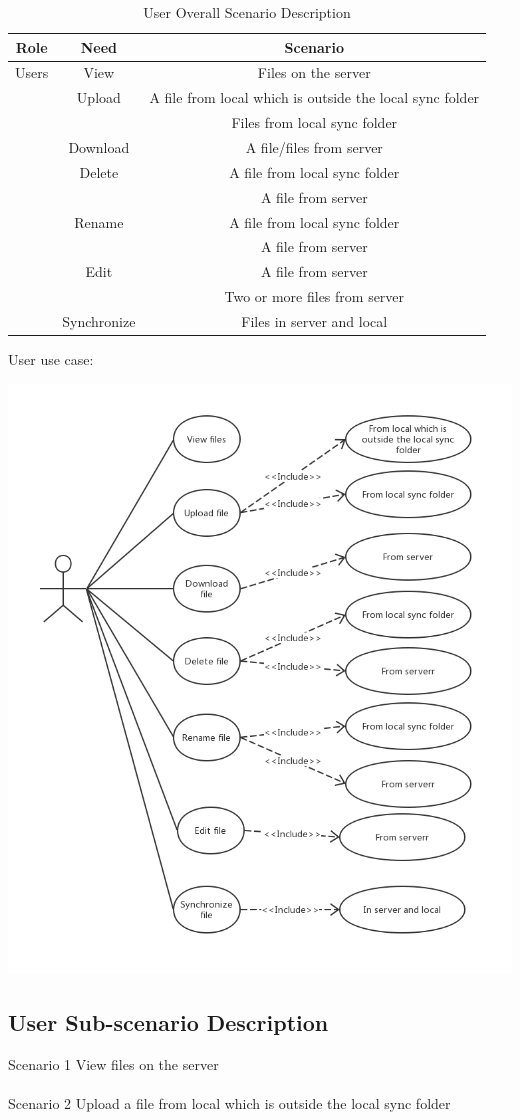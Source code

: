 \begin{table}[H]
\centering
\caption{User Overall Scenario Description}
\begin{tabular}{|c|c|c|}
\hline
Role & Need & Scenario\\
\hline
{Users} & View & Files on the server \\
\cline{2-3}
& Upload  & A file from local which is outside the local sync folder \\
\cline{3-3}
& {} & Files from local sync folder\\
\cline{2-3}
&Download & A file/files from server\\
\cline{2-3}
&Delete & A file from local sync folder\\
\cline{3-3}
&{} & A file from server\\
\cline{2-3}
&Rename & A file from local sync folder\\
\cline{3-3}
&{} & A file from server\\
\cline{2-3}
&Edit & A file from server\\
\cline{3-3}
&{} & Two or more files from server\\
\cline{2-3}
&Synchronize & Files in server and local\\
\hline
\bottomrule
\end{tabular}
\end{table}

User use case:\\
\begin{minipage}
\centering
\includegraphics[scale=0.5]{User_use_case.png}

\label{fig:User use case}
\end{minipage}

\subsection{User Sub-scenario Description}
Scenario 1 View files on the server\\\\
Scenario 2 Upload a file from local which is outside the local sync folder\\\\
